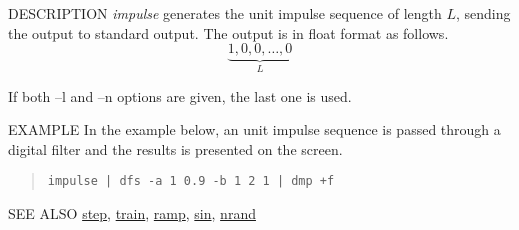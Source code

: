 \begin{synopsis}
\item[impulse] [ --l $L$ ] [ --n $N$ ]
\end{synopsis}

\begin{qsection}{DESCRIPTION}
{\em impulse} generates the unit impulse sequence of length $L$, 
sending the output to standard output. 
The output is in float format as follows.
\begin{displaymath}
\underbrace{1, 0, 0, \dots, 0}_{L}
\end{displaymath}

If both --l and --n options are given, the last one is used.
\end{qsection}

\begin{options}
\end{options}

\begin{qsection}{EXAMPLE}
In the example below, an unit impulse sequence is passed through 
a digital filter and the results is presented on the screen.
\begin{quote}
 \verb!impulse | dfs -a 1 0.9 -b 1 2 1 | dmp +f!
\end{quote}
\end{qsection}

\begin{qsection}{SEE ALSO}
\hyperlink{step}{step},
\hyperlink{train}{train},
\hyperlink{ramp}{ramp},
\hyperlink{sin}{sin},
\hyperlink{nrand}{nrand}
\end{qsection}

